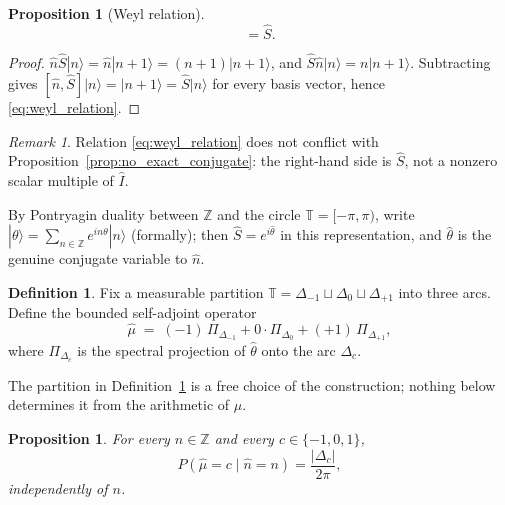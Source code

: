 \documentclass[11pt]{amsart}
\numberwithin{equation}{section}
\theoremstyle{plain}
\newtheorem{proposition}[theorem]{Proposition}
\theoremstyle{definition}
\newtheorem{definition}[theorem]{Definition}
\theoremstyle{remark}
\newtheorem{remark}[theorem]{Remark}
\newcommand{\Z}{\mathbb{Z}}
\begin{document}
\begin{proposition}[Weyl relation]
\label{prop:weyl_relation}
\begin{equation}
[\hat n,\hat S]=\hat S.
\label{eq:weyl_relation}
\end{equation}
\end{proposition}

\begin{proof}
$\hat n\hat S|n\rangle=\hat n|n+1\rangle=(n+1)|n+1\rangle$, and
$\hat S\hat n|n\rangle=n|n+1\rangle$. Subtracting gives
$[\hat n,\hat S]|n\rangle=|n+1\rangle=\hat S|n\rangle$ for every basis
vector, hence \eqref{eq:weyl_relation}.
\end{proof}

\begin{remark}
\label{rem:weyl_not_obstructed}
Relation \eqref{eq:weyl_relation} does not conflict with
Proposition~\ref{prop:no_exact_conjugate}: the right-hand side is
$\hat S$, not a nonzero scalar multiple of $\hat I$.
\end{remark}

By Pontryagin duality between $\Z$ and the circle $\mathbb{T}=[-\pi,\pi)$,
write $|\theta\rangle=\sum_{n\in\Z}e^{in\theta}|n\rangle$ (formally);
then $\hat S=e^{i\hat\theta}$ in this representation, and $\hat\theta$
is the genuine conjugate variable to $\hat n$.

\begin{definition}
\label{def:coarse_mobius_operator}
Fix a measurable partition $\mathbb{T}=\Delta_{-1}\sqcup\Delta_0\sqcup\Delta_{+1}$
into three arcs. Define the bounded self-adjoint operator
\begin{equation}
\hat\mu \;=\; (-1)\,\Pi_{\Delta_{-1}} + 0\cdot\Pi_{\Delta_0} + (+1)\,\Pi_{\Delta_{+1}},
\label{eq:coarse_mobius_operator}
\end{equation}
where $\Pi_{\Delta_c}$ is the spectral projection of $\hat\theta$ onto
the arc $\Delta_c$.
\end{definition}

The partition in Definition~\ref{def:coarse_mobius_operator} is a free
choice of the construction; nothing below determines it from the
arithmetic of $\mu$.

\begin{proposition}
\label{prop:flat_distribution}
For every $n\in\Z$ and every $c\in\{-1,0,1\}$,
\begin{equation}
P(\hat\mu=c \mid \hat n = n) = \frac{|\Delta_c|}{2\pi},
\label{eq:flat_distribution}
\end{equation}
independently of $n$.
\end{proposition}
\end{document}
